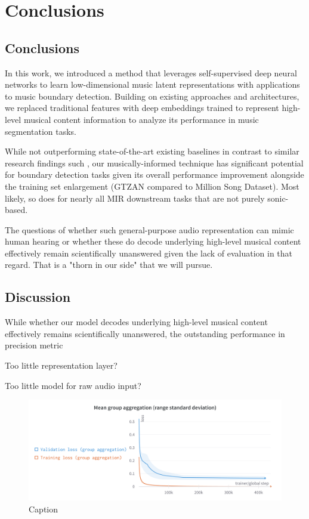 \chapter{Conclusions}

\section{Conclusions}

In this work, we introduced a method that leverages self-supervised deep neural networks to learn low-dimensional music latent representations with applications to music boundary detection. Building on existing approaches and architectures, we replaced traditional features with deep embeddings trained to represent high-level musical content information to analyze its performance in music segmentation tasks.

While not outperforming state-of-the-art existing baselines in contrast to similar research findings such \cite{deepfeaturesegment, SalamonDeepSegmentation}, our musically-informed technique has significant potential for boundary detection tasks given its overall performance improvement alongside the training set enlargement (GTZAN compared to Million Song Dataset). Most likely, so does for nearly all MIR downstream tasks that are not purely sonic-based.

The questions of whether such general-purpose audio representation can mimic human hearing \cite{Li2023MERT:Training, Turian2022HEAR:Representations} or whether these do decode underlying high-level musical content effectively remain scientifically unanswered given the lack of evaluation in that regard. That is a "thorn in our side" that we will pursue.

\section{Discussion}

While whether our model decodes underlying high-level musical content effectively remains scientifically unanswered, the outstanding performance in precision metric

Too little representation layer?

Too little model for raw audio input? \cite{verydeep}

\begin{figure}
    \centering
    \includegraphics[width=\textwidth]{figures/images/Mean group aggregation.png}
    \caption{Caption}
    \label{fig:enter-label}
\end{figure}



\newpage


